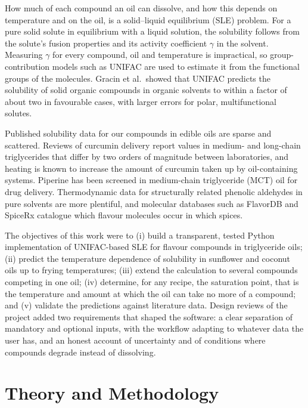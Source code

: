 \documentclass[journal=jceaax,manuscript=article,layout=twocolumn]{achemso}
\begin{document}
How much of each compound an oil can dissolve, and how this depends on temperature and on the oil, is a solid--liquid equilibrium (SLE) problem. For a pure solid solute in equilibrium with a liquid solution, the solubility follows from the solute's fusion properties and its activity coefficient $\gamma$ in the solvent.\cite{prausnitz1999,smith2018} Measuring $\gamma$ for every compound, oil and temperature is impractical, so group-contribution models such as UNIFAC are used to estimate it from the functional groups of the molecules.\cite{fredenslund1975,hansen1991} Gracin et al.\ showed that UNIFAC predicts the solubility of solid organic compounds in organic solvents to within a factor of about two in favourable cases, with larger errors for polar, multifunctional solutes.\cite{gracin2002}

Published solubility data for our compounds in edible oils are sparse and scattered. Reviews of curcumin delivery report values in medium- and long-chain triglycerides that differ by two orders of magnitude between laboratories,\cite{araiza2018} and heating is known to increase the amount of curcumin taken up by oil-containing systems.\cite{zou2016} Piperine has been screened in medium-chain triglyceride (MCT) oil for drug delivery.\cite{kusumorini2022} Thermodynamic data for structurally related phenolic aldehydes in pure solvents are more plentiful,\cite{wu2017,guo2017} and molecular databases such as FlavorDB and SpiceRx catalogue which flavour molecules occur in which spices.\cite{garg2018,rakhi2018}

The objectives of this work were to (i) build a transparent, tested Python implementation of UNIFAC-based SLE for flavour compounds in triglyceride oils; (ii) predict the temperature dependence of solubility in sunflower and coconut oils up to frying temperatures; (iii) extend the calculation to several compounds competing in one oil; (iv) determine, for any recipe, the saturation point, that is the temperature and amount at which the oil can take no more of a compound; and (v) validate the predictions against literature data. Design reviews of the project added two requirements that shaped the software: a clear separation of mandatory and optional inputs, with the workflow adapting to whatever data the user has, and an honest account of uncertainty and of conditions where compounds degrade instead of dissolving.

\section{Theory and Methodology}
\end{document}
